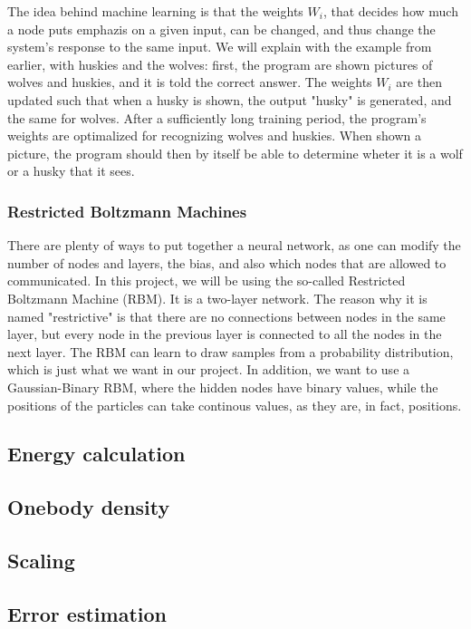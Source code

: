 \documentclass[norsk,a4paper,12pt]{article}
\begin{document}
The idea behind machine learning is that the weights $W_i$, that decides how much a node puts emphazis on a given input, can be changed, and thus change the system's response to the same input. We will explain with the example from earlier, with huskies and the wolves: first, the program are shown pictures of wolves and huskies, and it is told the correct answer. The weights $W_i$ are then updated such that when a husky is shown, the output "husky" is generated, and the same for wolves. After a sufficiently long training period, the program's weights are optimalized for recognizing wolves and huskies. When shown a picture, the program should then by itself be able to determine wheter it is a wolf or a husky that it sees. 

\subsubsection{Restricted Boltzmann Machines}
There are plenty of ways to put together a neural network, as one can modify the number of nodes and layers, the bias, and also which nodes that are allowed to communicated. In this project, we will be using the so-called Restricted Boltzmann Machine (RBM). It is a two-layer network. The reason why it is named "restrictive" is that there are no connections between nodes in the same layer, but every node in the previous layer is connected to all the nodes in the next layer. The RBM can learn to draw samples from a probability distribution, which is just what we want in our project. In addition, we want to use a Gaussian-Binary RBM, where the hidden nodes have binary values, while the positions of the particles can take continous values, as they are, in fact, positions. 


\subsection{Energy calculation}



\subsection{Onebody density}

\subsection{Scaling}

\subsection{Error estimation}
\end{document}
